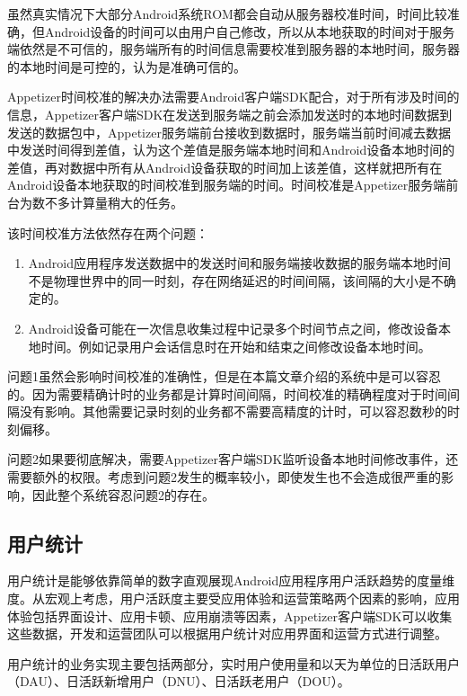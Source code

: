 虽然真实情况下大部分Android系统ROM都会自动从服务器校准时间，时间比较准确，但Android设备的时间可以由用户自己修改，所以从本地获取的时间对于服务端依然是不可信的，服务端所有的时间信息需要校准到服务器的本地时间，服务器的本地时间是可控的，认为是准确可信的。

Appetizer时间校准的解决办法需要Android客户端SDK配合，对于所有涉及时间的信息，Appetizer客户端SDK在发送到服务端之前会添加发送时的本地时间数据到发送的数据包中，Appetizer服务端前台接收到数据时，服务端当前时间减去数据中发送时间得到差值，认为这个差值是服务端本地时间和Android设备本地时间的差值，再对数据中所有从Android设备获取的时间加上该差值，这样就把所有在Android设备本地获取的时间校准到服务端的时间。时间校准是Appetizer服务端前台为数不多计算量稍大的任务。

该时间校准方法依然存在两个问题：

\begin{enumerate}
	\item Android应用程序发送数据中的发送时间和服务端接收数据的服务端本地时间不是物理世界中的同一时刻，存在网络延迟的时间间隔，该间隔的大小是不确定的。
	\item Android设备可能在一次信息收集过程中记录多个时间节点之间，修改设备本地时间。例如记录用户会话信息时在开始和结束之间修改设备本地时间。
\end{enumerate} 

问题1虽然会影响时间校准的准确性，但是在本篇文章介绍的系统中是可以容忍的。因为需要精确计时的业务都是计算时间间隔，时间校准的精确程度对于时间间隔没有影响。其他需要记录时刻的业务都不需要高精度的计时，可以容忍数秒的时刻偏移。

问题2如果要彻底解决，需要Appetizer客户端SDK监听设备本地时间修改事件，还需要额外的权限。考虑到问题2发生的概率较小，即使发生也不会造成很严重的影响，因此整个系统容忍问题2的存在。

\subsection{用户统计}
\label{subsec:usercomputing}

用户统计是能够依靠简单的数字直观展现Android应用程序用户活跃趋势的度量维度。从宏观上考虑，用户活跃度主要受应用体验和运营策略两个因素的影响，应用体验包括界面设计、应用卡顿、应用崩溃等因素，Appetizer客户端SDK可以收集这些数据，开发和运营团队可以根据用户统计对应用界面和运营方式进行调整。

用户统计的业务实现主要包括两部分，实时用户使用量和以天为单位的日活跃用户（DAU）、日活跃新增用户（DNU）、日活跃老用户（DOU）。

